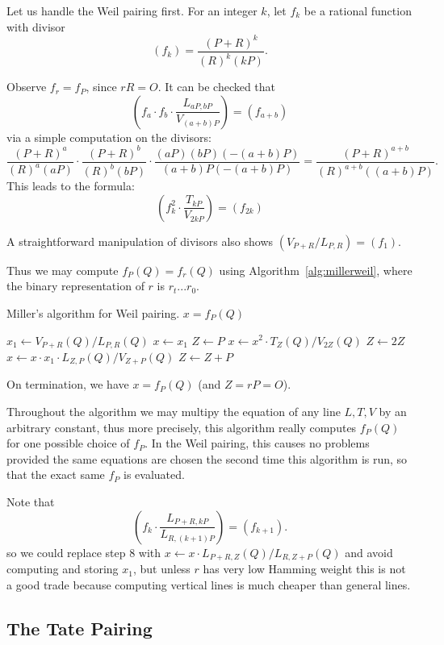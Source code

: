 Let us handle the Weil pairing first. For an integer $k$, let
$f_k$ be a rational function with divisor
\[
(f_k) = \frac{(P+R)^k}{(R)^k(kP)} .
\]

Observe $f_r = f_P$, since $rR = O$.
It can be checked that
\[
\left(
f_a \cdot f_b \cdot \frac{L_{aP,bP}}{V_{(a+b)P}}
\right) = (f_{a+b})
\]
via a simple computation on the divisors:
\[
\frac{(P+R)^a}{(R)^a(aP)}
\cdot
\frac{(P+R)^b}{(R)^b(bP)}
\cdot
\frac{(aP)(bP)(-(a+b)P)}{(a+b)P(-(a+b)P)}
=
\frac{(P+R)^{a+b}}{(R)^{a+b}((a+b)P)} .
\]
This leads to the formula:
\[
\left(
f_k^2 \cdot \frac{T_{kP}}{V_{2kP}}
\right) = (f_{2k})
\]

A straightforward manipulation of divisors also shows
$( V_{P+R} / L_{P,R}) = (f_1)$.

Thus we may compute $f_P(Q) = f_r(Q)$ using Algorithm~\ref{alg:millerweil},
where the binary representation of $r$ is $r_t ... r_0$.

\begin{algorithm}
\caption{\label{alg:millerweil}Miller's algorithm for Weil pairing. $x = f_P(Q)$}
\begin{algorithmic}[1]
\STATE $x_1 \gets V_{P+R}(Q) / L_{P,R}(Q)$
\STATE $x \gets x_1$
\STATE $Z \gets P$
    \STATE $x \gets x^2 \cdot T_Z(Q) / V_{2Z}(Q)$
    \STATE $Z \gets 2Z$
	\STATE $x \gets x \cdot x_1 \cdot L_{Z, P}(Q) / V_{Z+P}(Q)$
	\STATE $Z \gets Z + P$
    \ENDIF
\ENDFOR
\end{algorithmic}
\end{algorithm}

On termination, we have $x = f_P(Q)$ (and $Z = rP = O$).

Throughout the algorithm we may multipy the equation of any line $L, T, V$
by an arbitrary constant, thus more precisely, this algorithm
really computes $f_P(Q)$ for one possible choice of $f_P$.
In the Weil pairing,
this causes no problems provided the same equations are chosen the second
time this algorithm is run, so that the exact same $f_P$ is evaluated.

Note that
\[
\left(
f_k \cdot \frac{L_{P+R,kP}}{L_{R,(k+1)P}}
\right) = (f_{k+1}) .
\]
so we could replace step 8 with
$x \gets x \cdot L_{P+R, Z}(Q) / L_{R,Z+P}(Q)$
and avoid computing and storing $x_1$, but unless
$r$ has very low Hamming weight this is not a good trade
because computing vertical lines is much cheaper than general lines.

\subsection {The Tate Pairing}

